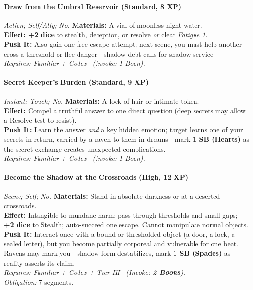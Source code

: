 \paragraph{Draw from the Umbral Reservoir (Standard, 8 XP)} \emph{Action; Self/Ally; No.}
\textbf{Materials:} A vial of moonless-night water.\\
\textbf{Effect:} \textbf{+2 dice} to stealth, deception, or resolve \emph{or} clear \emph{Fatigue 1}.\\
\textbf{Push It:} Also gain one free escape attempt; next scene, you must help another cross a threshold or flee danger—shadow-debt calls for shadow-service.\\
\emph{Requires: Familiar + Codex \ (\textit{Invoke:} 1 Boon).}

\paragraph{Secret Keeper's Burden (Standard, 9 XP)} \emph{Instant; Touch; No.}
\textbf{Materials:} A lock of hair or intimate token.\\
\textbf{Effect:} Compel a truthful answer to one direct question (deep secrets may allow a Resolve test to resist).\\
\textbf{Push It:} Learn the answer \emph{and} a key hidden emotion; target learns one of your secrets in return, carried by a raven to them in dreams—mark \textbf{1 SB (Hearts)} as the secret exchange creates unexpected complications.\\
\emph{Requires: Familiar + Codex \ (\textit{Invoke:} 1 Boon).}

\paragraph{Become the Shadow at the Crossroads (High, 12 XP)} \emph{Scene; Self; No.}
\textbf{Materials:} Stand in absolute darkness or at a deserted crossroads.\\
\textbf{Effect:} Intangible to mundane harm; pass through thresholds and small gaps; \textbf{+2 dice} to Stealth; auto-succeed one escape. Cannot manipulate normal objects.\\
\textbf{Push It:} Interact once with a bound or thresholded object (a door, a lock, a sealed letter), but you become partially corporeal and vulnerable for one beat. Ravens may mark you—shadow-form destabilizes, mark \textbf{1 SB (Spades)} as reality asserts its claim.\\
\emph{Requires: Familiar + Codex + Tier III \ (\textit{Invoke:} \textbf{2 Boons}).}\\
\emph{Obligation:} 7 segments.


